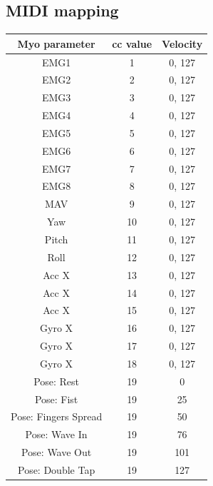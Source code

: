 \documentclass[12pt,a4paper]{article}
\begin{document}
	\subsection{MIDI mapping}
	\begin{tabular}{|c|c|c|}\hline
		\textbf{Myo parameter} & \textbf{cc value} & \textbf{Velocity} \\ \hline
		EMG1 & 1 & 0, 127 \\ \hline
		EMG2 & 2 & 0, 127 \\ \hline
		EMG3 & 3 & 0, 127 \\ \hline
		EMG4 & 4 & 0, 127 \\ \hline
		EMG5 & 5 & 0, 127 \\ \hline
		EMG6 & 6 & 0, 127 \\ \hline
		EMG7 & 7 & 0, 127 \\ \hline
		EMG8 & 8 & 0, 127 \\ \hline
		MAV  & 9 & 0, 127 \\ \hline
		Yaw & 10 & 0, 127 \\ \hline
		Pitch & 11 & 0, 127 \\ \hline
		Roll & 12 & 0, 127 \\ \hline
		Acc X & 13 & 0, 127 \\ \hline
		Acc X & 14 & 0, 127 \\ \hline
		Acc X & 15 & 0, 127 \\ \hline
		Gyro X & 16 & 0, 127 \\ \hline
		Gyro X & 17 & 0, 127 \\ \hline
		Gyro X & 18 & 0, 127 \\ \hline
		Pose: Rest & 19  & 0 \\ \hline
		Pose: Fist & 19 & 25 \\ \hline
		Pose: Fingers Spread & 19 & 50 \\ \hline
		Pose: Wave In & 19 & 76 \\ \hline
		Pose: Wave Out & 19 & 101 \\ \hline
		Pose: Double Tap & 19 & 127 \\ \hline
	\end{tabular} 
\newpage	
\end{document}
